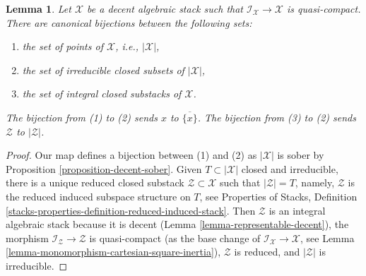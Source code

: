 \documentclass[10pt,a4paper]{amsart}
\theoremstyle{plain}
\newtheorem{lemma}[subsection]{Lemma}
\theoremstyle{definition}
\theoremstyle{remark}
\numberwithin{equation}{subsection}
\begin{document}
\begin{lemma}
\label{lemma-decent-irreducible-closed}
Let $\mathcal{X}$ be a decent algebraic stack such that
$\mathcal{I}_\mathcal{X} \to \mathcal{X}$ is quasi-compact.
There are canonical bijections between the following sets:
\begin{enumerate}
\item the set of points of $\mathcal{X}$, i.e., $|\mathcal{X}|$,
\item the set of irreducible closed subsets of $|\mathcal{X}|$,
\item the set of integral closed substacks of $\mathcal{X}$.
\end{enumerate}
The bijection from (1) to (2) sends $x$ to $\overline{\{x\}}$.
The bijection from (3) to (2) sends $\mathcal{Z}$ to $|\mathcal{Z}|$.
\end{lemma}

\begin{proof}
Our map defines a bijection between (1) and (2) as $|\mathcal{X}|$ is
sober by  Proposition \ref{proposition-decent-sober}.
Given $T \subset |\mathcal{X}|$ closed and irreducible, there is a
unique reduced closed substack $\mathcal{Z} \subset \mathcal{X}$
such that $|\mathcal{Z}| = T$, namely, $\mathcal{Z}$
is the reduced induced subspace structure on $T$, see
Properties of Stacks, Definition
\ref{stacks-properties-definition-reduced-induced-stack}.
Then $\mathcal{Z}$ is an integral algebraic stack because it is
decent (Lemma \ref{lemma-representable-decent}), the
morphism $\mathcal{I}_\mathcal{Z} \to \mathcal{Z}$ is quasi-compact
(as the base change of $\mathcal{I}_\mathcal{X} \to \mathcal{X}$, see
Lemma \ref{lemma-monomorphism-cartesian-square-inertia}),
$\mathcal{Z}$ is reduced, and $|\mathcal{Z}|$ is irreducible.
\end{proof}
\end{document}
